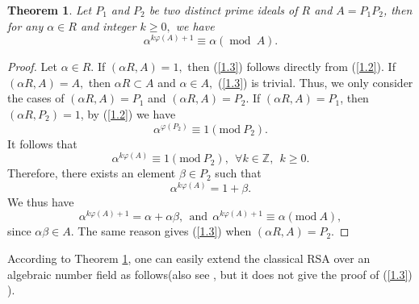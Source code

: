 \documentclass [11pt]{article}
\newtheorem{thm}{\bf Theorem}[section]
\begin{document}
\begin{thm}\label{th1}
Let $P_{1}$ and $P_{2}$ be two distinct prime ideals of $R$ and $A=P_{1}P_{2}$, then for any $\alpha \in R$ and integer $k\geq 0,$ we have
\begin{equation}\label{1.3}
\alpha^{k\varphi(A)+1}\equiv \alpha(\operatorname{mod} \  A).
\end{equation}

\end{thm}
\begin{proof}
Let $ \alpha \in R.$ If $(\alpha R, A)=1,$ then  (\ref{1.3}) follows directly from (\ref{1.2}). If $(\alpha R, A)=A,$ then $ \alpha R \subset  A$ and $ \alpha \in A,$ (\ref{1.3}) is trivial. Thus, we only consider the cases of $(\alpha R, A)=P_{1}$ and $(\alpha R, A)=P_{2}$. If
$ (\alpha R, A)=P_{1}$, then $ (\alpha R, P_{2})=1$, by (\ref{1.2}) we have
$$
\alpha^{\varphi(P_{2})}\equiv 1(\text{mod}\  P_{2}).
$$
It follows that
$$
\alpha^{k \varphi(A)}\equiv 1(\text{mod}\  P_{2}),\ \ \forall k \in \mathbb{Z},\ \ k\geq 0.
$$
Therefore, there exists an element $\beta \in P_{2}$ such that
$$
\alpha^{k \varphi(A)}= 1+ \beta.
$$
We thus have
$$
\alpha^{k \varphi(A)+1}= \alpha+ \alpha\beta, \ \ \text{and} \ \ \alpha^{k \varphi(A)+1}\equiv \alpha(\text{mod}\ A),
$$
since $ \alpha\beta \in A.$ The same reason gives (\ref{1.3}) when $ (\alpha R, A)=P_{2}$.


\end{proof}

According to Theorem \ref{th1}, one can easily extend the classical RSA over an algebraic number field as follows(also see \cite{T} , but it does not give the proof of (\ref{1.3}) ).
\end{document}
